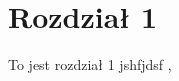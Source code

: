 \documentclass[document.tex]{subfiles}
\begin{document}
\chapter{Rozdział 1}
To jest rozdział 1
jshfjdsf \cite{wikipedia1},\cite{goossens93}
\cite{wikipedia2}
\end{document}
